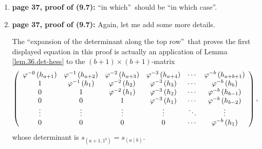 \documentclass[numbers=enddot,12pt,final,onecolumn,notitlepage]{scrartcl}%
\theoremstyle{definition}
\newenvironment{proof}[1][Proof]{\noindent\textbf{#1.} }{\ \rule{0.5em}{0.5em}}
\begin{document}
\begin{enumerate}
\begin{proof}
The definition of $\omega$ yields $\omega\left(  \varphi^{s}h_{r}\right)
=\varphi^{-s}e_{r}$. But (\ref{p37.omg-commute}) (applied to $t=-s$) yields
$\omega\circ\varphi^{-s}=\varphi^{-\left(  -s\right)  }\circ\omega=\varphi
^{s}\circ\omega$. Now,
\begin{align*}
\left(  \omega\circ\omega\right)  \left(  \varphi^{s}h_{r}\right)   &
=\omega\underbrace{\left(  \omega\left(  \varphi^{s}h_{r}\right)  \right)
}_{=\varphi^{-s}e_{r}}=\omega\left(  \varphi^{-s}e_{r}\right) \\
&  =\underbrace{\left(  \omega\circ\varphi^{-s}\right)  }_{=\varphi^{s}%
\circ\omega}\left(  e_{r}\right)  =\left(  \varphi^{s}\circ\omega\right)
\left(  e_{r}\right)  =\varphi^{s}\underbrace{\left(  \omega e_{r}\right)
}_{=h_{r}}=\varphi^{s}h_{r}.
\end{align*}
In other words, $\omega\circ\omega$ fixes $\varphi^{s}h_{r}$.

Forget that we fixed $r,s$. We thus have shown that the $\mathbb{Z}$-algebra
morphism $\omega\circ\omega$ fixes each of the generators $\varphi^{s}h_{r}$
of the $\mathbb{Z}$-algebra $R$. This shows that this morphism $\omega
\circ\omega$ must be the identity (because a $\mathbb{Z}$-algebra morphism
that fixes each of the generators of its domain must be the identity). In
other words, $\omega$ is an involution. This proves (\ref{p37.omg-invol}).
\end{proof}

\item \textbf{page 37, proof of (9.7):} \textquotedblleft in
which\textquotedblright\ should be \textquotedblleft in which
case\textquotedblright.

\item \textbf{page 37, proof of (9.7):} Again, let me add some more details.

The \textquotedblleft expansion of the determinant along the top
row\textquotedblright\ that proves the first displayed equation in this proof
is actually an application of Lemma \ref{lem.36.det-hess} to the $\left(
b+1\right)  \times\left(  b+1\right)  $-matrix%
\[
\left(
\begin{array}
[c]{cccccc}%
\varphi^{-0}\left(  h_{a+1}\right)  & \varphi^{-1}\left(  h_{a+2}\right)  &
\varphi^{-2}\left(  h_{a+3}\right)  & \varphi^{-3}\left(  h_{a+4}\right)  &
\cdots & \varphi^{-b}\left(  h_{a+b+1}\right) \\
1 & \varphi^{-1}\left(  h_{1}\right)  & \varphi^{-2}\left(  h_{2}\right)  &
\varphi^{-3}\left(  h_{3}\right)  & \cdots & \varphi^{-b}\left(  h_{b}\right)
\\
0 & 1 & \varphi^{-2}\left(  h_{1}\right)  & \varphi^{-3}\left(  h_{2}\right)
& \cdots & \varphi^{-b}\left(  h_{b-1}\right) \\
0 & 0 & 1 & \varphi^{-3}\left(  h_{1}\right)  & \cdots & \varphi^{-b}\left(
h_{b-2}\right) \\
\vdots & \vdots & \vdots & \vdots & \ddots & \vdots\\
0 & 0 & 0 & 0 & \cdots & \varphi^{-b}\left(  h_{1}\right)
\end{array}
\right)  ,
\]
whose determinant is $s_{\left(  a+1,1^{b}\right)  }=s_{\left(  a\mid
b\right)  }$.


\end{enumerate}
\end{document}

